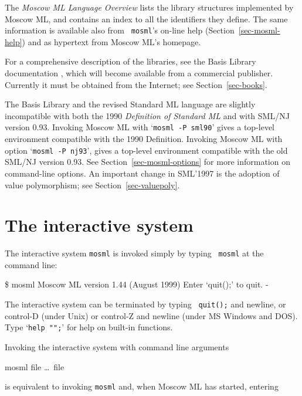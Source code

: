 \documentclass[fleqn]{article}
\begin{document}
The {\em Moscow ML Language Overview\/}
\cite{MoscowML:1999:MoscowMLLanguage} lists the library structures
implemented by Moscow ML, and contains an index to all the identifiers
they define.  The same information is available also from {\tt
  mosml}'s on-line help (Section~\ref{sec-mosml-help}) and as
hypertext from Moscow ML's homepage.

For a comprehensive description of the libraries, see the Basis
Library documentation \cite{SMLBasis:1996:StandardML}, which will
become available from a commercial publisher.  Currently it must be
obtained from the Internet; see Section~\ref{sec-books}.

The Basis Library and the revised Standard ML language are slightly
incompatible with both the 1990 {\em Definition of Standard ML\/} and
with SML/NJ version 0.93.  Invoking Moscow ML with `{\tt mosml -P
  sml90}' gives a top-level environment compatible with the 1990
Definition.  Invoking Moscow ML with option `{\tt mosml -P nj93}',
gives a top-level environment compatible with the old SML/NJ version
0.93.  See Section~\ref{sec-mosml-options} for more information on
command-line options.  An important change in SML'1997 is the adoption
of value polymorphism; see Section~\ref{sec-valuepoly}.



\section{The interactive system}
\label{sec-interactive-system}

The interactive system {\tt mosml} is invoked simply by typing {\tt
  mosml} at the command line:

\begin{program}
\$ mosml
Moscow ML version 1.44 (August 1999)
Enter `quit();' to quit.
- 
\end{program}

\noindent The interactive system can be terminated by typing {\tt
  quit();} and newline, or control-D (under Unix) or control-Z and
newline (under MS Windows and DOS).  Type `{\tt help "";}' for help on
built-in functions.

Invoking the interactive system with command line arguments

\begin{program}
mosml file \ldots\ file
\end{program}

\noindent is equivalent to invoking {\tt mosml} and, when Moscow ML
has started, entering
\end{document}
